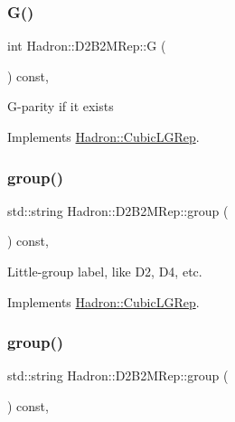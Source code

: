 \subsubsection{\texorpdfstring{G()}{G()}\hspace{0.1cm}{\footnotesize\ttfamily [2/2]}}
{\footnotesize\ttfamily int Hadron\+::\+D2\+B2\+M\+Rep\+::G (\begin{DoxyParamCaption}{ }\end{DoxyParamCaption}) const\hspace{0.3cm}{\ttfamily [inline]}, {\ttfamily [virtual]}}

G-\/parity if it exists 

Implements \mbox{\hyperlink{structHadron_1_1CubicLGRep_ace26f7b2d55e3a668a14cb9026da5231}{Hadron\+::\+Cubic\+L\+G\+Rep}}.

\mbox{\label{structHadron_1_1D2B2MRep_a5eb48e359e6867273037597c30363ba7}} 
\subsubsection{\texorpdfstring{group()}{group()}\hspace{0.1cm}{\footnotesize\ttfamily [1/2]}}
{\footnotesize\ttfamily std\+::string Hadron\+::\+D2\+B2\+M\+Rep\+::group (\begin{DoxyParamCaption}{ }\end{DoxyParamCaption}) const\hspace{0.3cm}{\ttfamily [inline]}, {\ttfamily [virtual]}}

Little-\/group label, like D2, D4, etc. 

Implements \mbox{\hyperlink{structHadron_1_1CubicLGRep_a9bdb14b519a611d21379ed96a3a9eb41}{Hadron\+::\+Cubic\+L\+G\+Rep}}.

\mbox{\label{structHadron_1_1D2B2MRep_a5eb48e359e6867273037597c30363ba7}} 
\subsubsection{\texorpdfstring{group()}{group()}\hspace{0.1cm}{\footnotesize\ttfamily [2/2]}}
{\footnotesize\ttfamily std\+::string Hadron\+::\+D2\+B2\+M\+Rep\+::group (\begin{DoxyParamCaption}{ }\end{DoxyParamCaption}) const\hspace{0.3cm}{\ttfamily [inline]}, {\ttfamily [virtual]}}

